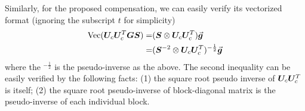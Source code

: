 Similarly, for the proposed compensation, we can easily verify its vectorized format (ignoring the subscript $t$ for simplicity)
\begin{align*}
    \operatorname{Vec}({\bm{U}}_c{\bm{U}}_c^T{\bm{G}}{\bm{S}}) =& ({\bm{S}}\otimes {\bm{U}}_c{\bm{U}}_c^T)\vec{\bm{g}}\\
    =& ({\bm{S}}^{-2}\otimes {\bm{U}}_c{\bm{U}}_c^T)^{-\frac{1}{2}}\vec{\bm{g}}
\end{align*}
where the $^{-\frac{1}{2}}$ is the pseudo-inverse as the above. The second inequality can be easily verified by the following facts:
(1) the square root pseudo inverse of ${\bm{U}}_c{\bm{U}}_c^T$ is itself; (2) the square root pseudo-inverse of block-diagonal matrix is the pseudo-inverse of each individual block. 